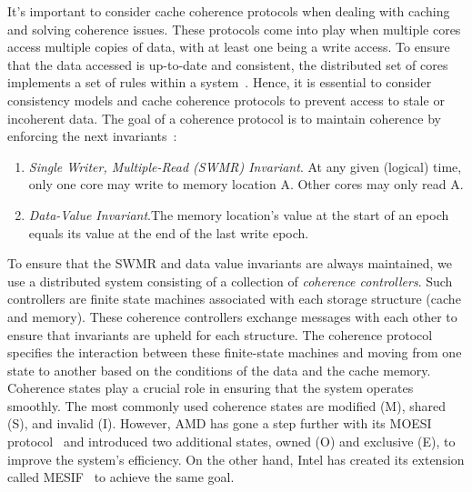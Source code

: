 It's important to consider cache coherence protocols when dealing with caching and solving coherence issues. These protocols come into play when multiple cores access multiple copies of data, with at least one being a write access. To ensure that the data accessed is up-to-date and consistent, the distributed set of cores implements a set of rules within a system~\cite{DBLP_series_synthesis_2020Nagarajan}. Hence, it is essential to consider consistency models and cache coherence protocols to prevent access to stale or incoherent data. The goal of a coherence protocol is to maintain coherence by enforcing the next invariants~\cite{DBLP_series_synthesis_2020Nagarajan}:

\begin{enumerate}
  \item \emph{Single Writer, Multiple-Read (SWMR) Invariant}. At any given 
 (logical) time, only one core may write to memory location A. Other cores may only read A.

  \item \emph{Data-Value Invariant}.The memory location's value at the start of an epoch equals its value at the end of the last write epoch.
\end{enumerate}

To ensure that the SWMR and data value invariants are always maintained, we use a distributed system consisting of a collection of \emph{coherence controllers}. Such controllers are finite state machines associated with each storage structure (cache and memory). These coherence controllers exchange messages with each other to ensure that invariants are upheld for each structure. The coherence protocol specifies the interaction between these finite-state machines and moving from one state to another based on the conditions of the data and the cache memory. 
Coherence states play a crucial role in ensuring that the system operates smoothly. The most commonly used coherence states are modified (M), shared (S), and invalid (I). However, AMD has gone a step further with its MOESI protocol~\cite{devices_amd64} and introduced two additional states, owned (O) and exclusive (E), to improve the system's efficiency. On the other hand, Intel has created its extension called MESIF~\cite{guideintel} to achieve the same goal. 

